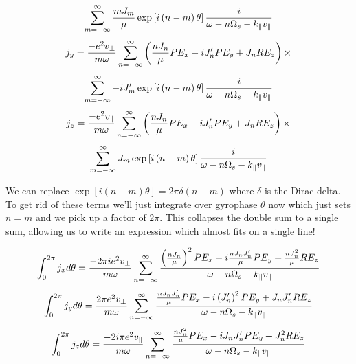 \begin{equation}
	\sum_{m=-\infty}^\infty \frac{mJ_m}{\mu} \exp \left[i\left(n - m\right) \theta \right] \frac{i}{\omega - n\Omega_s - k_\parallel v_\parallel}
\end{equation}
\begin{equation*}
	j_y = \frac{-e^2v_\perp}{m \omega} \sum_{n=-\infty}^\infty \left(\frac{nJ_n}{\mu} P E_x - i J_n' P E_y + J_n R E_z \right) \times
\end{equation*}
\begin{equation}
	\sum_{m=-\infty}^\infty -iJ_m' \exp \left[i\left(n - m\right) \theta \right] \frac{i}{\omega - n\Omega_s - k_\parallel v_\parallel}
\end{equation}
\begin{equation*}
	j_z = \frac{-e^2v_\parallel}{m \omega} \sum_{n=-\infty}^\infty \left(\frac{nJ_n}{\mu} P E_x - i J_n' P E_y + J_n R E_z \right) \times
\end{equation*}
\begin{equation}
	\sum_{m=-\infty}^\infty J_m \exp \left[i\left(n - m\right) \theta \right] \frac{i}{\omega - n\Omega_s - k_\parallel v_\parallel}
\end{equation}

We can replace $\exp \left[i\left(n - m\right) \theta \right] = 2\pi\delta\left(n-m\right)$ where $\delta$ is the Dirac delta. To get rid of these terms we'll just integrate over gyrophase $\theta$ now which just sets $n=m$ and we pick up a factor of $2\pi$. This collapses the double sum to a single sum, allowing us to write an expression which almost fits on a single line!

\begin{equation}
	\int_0^{2\pi} j_x d\theta = \frac{-2\pi ie^2v_\perp}{m \omega} \sum_{n=-\infty}^\infty \frac{\left(\frac{nJ_n}{\mu}\right)^2 P E_x - i \frac{nJ_n J_n'}{\mu} P E_y + \frac{nJ_n^2}{\mu} R E_z}{\omega - n\Omega_s - k_\parallel v_\parallel}
\end{equation}
\begin{equation}
	\int_0^{2\pi} j_y d\theta = \frac{2\pi e^2v_\perp}{m \omega} \sum_{n=-\infty}^\infty \frac{\frac{nJ_nJ_n'}{\mu} P E_x - i \left(J_n'\right)^2 P E_y + J_n J_n' R E_z}{\omega - n\Omega_s - k_\parallel v_\parallel}
\end{equation}
\begin{equation}
	\int_0^{2\pi} j_z d\theta = \frac{-2i\pi e^2v_\parallel}{m \omega} \sum_{n=-\infty}^\infty \frac{\frac{nJ_n^2}{\mu} P E_x - i J_n J_n' P E_y + J_n^2 R E_z}{\omega - n\Omega_s - k_\parallel v_\parallel}
\end{equation}

